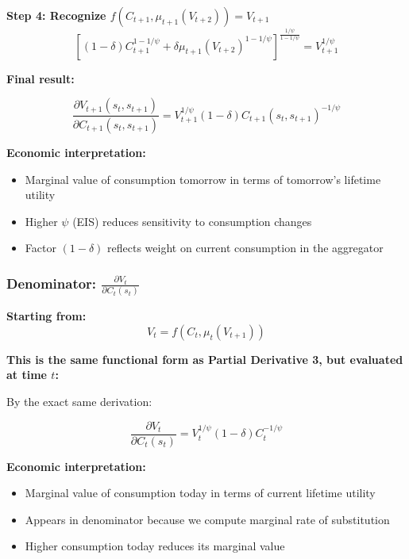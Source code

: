 \documentclass{beamer}
\begin{document}
\begin{frame}[allowframebreaks]
    \framebreak
    
    \textbf{Step 4: Recognize $f(C_{t+1}, \mu_{t+1}(V_{t+2})) = V_{t+1}$}
    \begin{equation*}
        \left[ (1-\delta)C_{t+1}^{1-1/\psi} + \delta\mu_{t+1}(V_{t+2})^{1-1/\psi} \right]^{\frac{1/\psi}{1-1/\psi}} = V_{t+1}^{1/\psi}
    \end{equation*}
    
    \framebreak
    
    \textbf{Final result:}
    \begin{tcolorbox}[colback=blue!5!white, colframe=blue!75!black, title=Partial Derivative 3]
    \begin{equation*}
        \frac{\partial V_{t+1}(s_t, s_{t+1})}{\partial C_{t+1}(s_t, s_{t+1})} = V_{t+1}^{1/\psi} (1-\delta) C_{t+1}(s_t, s_{t+1})^{-1/\psi}
    \end{equation*}
    \end{tcolorbox}
    
    \textbf{Economic interpretation:}
    \begin{itemize}
        \item Marginal value of consumption tomorrow in terms of tomorrow's lifetime utility
        \item Higher $\psi$ (EIS) reduces sensitivity to consumption changes
        \item Factor $(1-\delta)$ reflects weight on current consumption in the aggregator
    \end{itemize}
\end{frame}

\begin{frame}[allowframebreaks]
    \frametitle{Denominator: $\frac{\partial V_t}{\partial C_t(s_t)}$}
    
    \textbf{Starting from:}
    \begin{equation*}
        V_t = f(C_t, \mu_t(V_{t+1}))
    \end{equation*}
    
    \textbf{This is the same functional form as Partial Derivative 3, but evaluated at time $t$:}
    
    By the exact same derivation:
    \begin{tcolorbox}[colback=blue!5!white, colframe=blue!75!black, title=Denominator]
    \begin{equation*}
        \frac{\partial V_t}{\partial C_t(s_t)} = V_t^{1/\psi} (1-\delta) C_t^{-1/\psi}
    \end{equation*}
    \end{tcolorbox}
    
    \textbf{Economic interpretation:}
    \begin{itemize}
        \item Marginal value of consumption today in terms of current lifetime utility
        \item Appears in denominator because we compute marginal rate of substitution
        \item Higher consumption today reduces its marginal value
    \end{itemize}
\end{frame}
\end{document}
